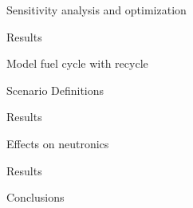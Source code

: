 \documentclass{report}
\begin{document}
\begin{outline}
\item Sensitivity analysis and optimization
\begin{outline}
    \item Results
\end{outline}

\item Model fuel cycle with recycle 
\begin{outline}
    \item Scenario Definitions
    \item Results
\end{outline}

\item Effects on neutronics
\begin{outline}
    \item Results
\end{outline}

\item Conclusions
\end{outline}




\end{document}
